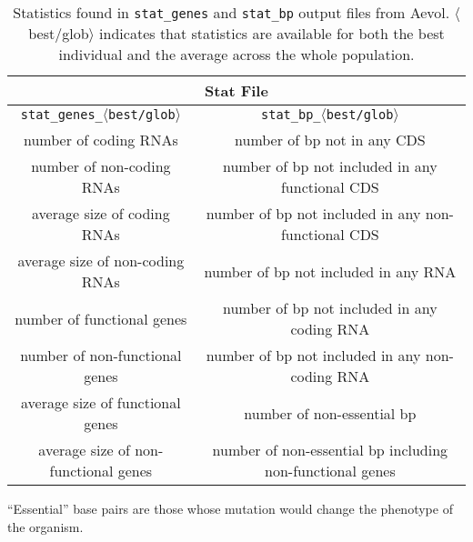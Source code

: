 \begin{table}[H]
	\centering
	\begin{tabular}{ |c|c| }
		\hline
		\multicolumn{2}{|c|}{\textbf{Stat File}} \\
		\hline
		\texttt{stat\_genes\_}$\langle$\texttt{best/glob}$\rangle$ & \texttt{stat\_bp\_}$\langle$\texttt{best/glob}$\rangle$ \\
		\hline \hline
		number of coding RNAs & number of bp not in any CDS \\
		\hline
		number of non-coding RNAs & number of bp not included in any functional CDS \\
		\hline
		average size of coding RNAs & number of bp not included in any non-functional CDS \\
		\hline
		average size of non-coding RNAs & number of bp not included in any RNA \\
		\hline
		number of functional genes & number of bp not included in any coding RNA \\
		\hline
		number of non-functional genes & number of bp not included in any non-coding RNA \\
		\hline
		average size of functional genes & number of non-essential bp \\
		\hline
		average size of non-functional genes & number of non-essential bp including non-functional genes \\
		\hline
	\end{tabular}
	\caption[Aevol's stats: genes and base pairs]{Statistics found in \texttt{stat\_genes} and \texttt{stat\_bp} output files from Aevol. $\langle$best/glob$\rangle$ indicates that statistics are available for both the best individual and the average across the whole population.}
	\label{table:aevol_stats_genes_and_bp}
\end{table}
``Essential'' base pairs are those whose mutation would change the phenotype of the organism.
